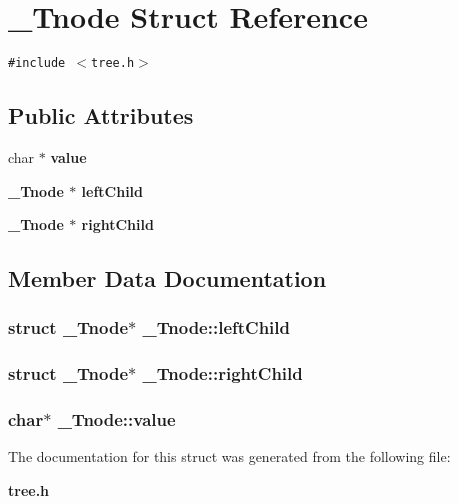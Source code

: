 \section{\_\-Tnode Struct Reference}
\label{struct__Tnode}
{\tt \#include $<$tree.h$>$}

\subsection*{Public Attributes}
\begin{CompactItemize}
\item 
char $\ast$ \bf{value}
\item 
\bf{\_\-Tnode} $\ast$ \bf{left\-Child}
\item 
\bf{\_\-Tnode} $\ast$ \bf{right\-Child}
\end{CompactItemize}


\subsection{Member Data Documentation}
\subsubsection{\setlength{\rightskip}{0pt plus 5cm}struct \bf{\_\-Tnode}$\ast$ \bf{\_\-Tnode::left\-Child}}\label{struct__Tnode_bd46e0f828d7356782e8a518a777cd90}


\subsubsection{\setlength{\rightskip}{0pt plus 5cm}struct \bf{\_\-Tnode}$\ast$ \bf{\_\-Tnode::right\-Child}}\label{struct__Tnode_77a6c8948bc81812562b3c951b6f0d9a}


\subsubsection{\setlength{\rightskip}{0pt plus 5cm}char$\ast$ \bf{\_\-Tnode::value}}\label{struct__Tnode_aee481cbe40cd81e0476cfce210be772}




The documentation for this struct was generated from the following file:\begin{CompactItemize}
\item 
\bf{tree.h}\end{CompactItemize}
